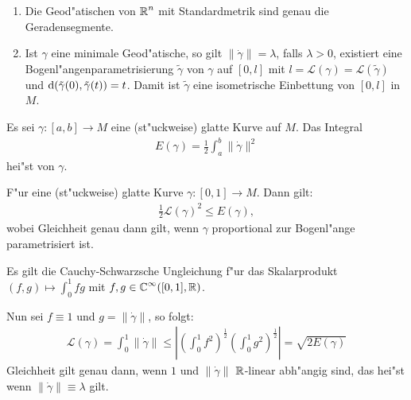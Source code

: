 
\begin{bem}
  \begin{enumerate}[label=(\arabic*),leftmargin=*]
  \item Die Geod"atischen von $\operatorname{\mathbb{R}}^n$ mit Standardmetrik sind genau die Geradensegmente.
  \item Ist $\gamma$ eine minimale Geod"atische, so gilt $\|\dot\gamma\| = \lambda$, falls $\lambda > 0$, existiert eine Bogenl"angenparametrisierung $\tilde\gamma$ von $\gamma$ auf $[0,l]$ mit $l = \mathcal L(\gamma) = \mathcal L(\tilde\gamma)$ und $\mathrm{d}(\tilde\gamma(0),\tilde\gamma(t)) = t$.
    Damit ist $\tilde\gamma$ eine isometrische Einbettung von $[0,l]$ in $M$.
  \end{enumerate}
\end{bem}

\begin{Dfn}
  Es sei $\gamma \colon [a,b] \to M$ eine (st"uckweise) glatte Kurve auf $M$.
  Das Integral
  \begin{align*}
    E(\gamma) = \frac{1}2 \int_a^b\|\dot\gamma\|^2
  \end{align*}
  hei"st  von $\gamma$.
\end{Dfn}

\begin{Lemma}\label{lemma-6-9}
  F"ur eine (st"uckweise) glatte Kurve $\gamma \colon [0,1] \to M$.
  Dann gilt:
  \begin{align*}
    \frac{1}2 \mathcal L(\gamma)^2 \leq E(\gamma),
  \end{align*}
  wobei Gleichheit genau dann gilt, wenn $\gamma$ proportional zur Bogenl"ange parametrisiert ist.
\end{Lemma}

\begin{bew}
  Es gilt die Cauchy-Schwarzsche Ungleichung f"ur das Skalarprodukt $(f,g) \mapsto \int_0^1 fg$ mit $f,g \in \operatorname{\mathbb{C}}^{\infty}([0,1], \operatorname{\mathbb{R}})$.

  Nun sei $f \equiv 1$ und $g = \|\dot\gamma\|$, so folgt:
  \begin{align*}
    \mathcal L(\gamma) = \int_0^1 \|\dot\gamma\| \leq \left|\left(\int_0^1 f^2\right)^{\frac{1}2} \left(\int_0^1g^2\right)^{\frac{1}2}\right| = \sqrt{2 E(\gamma)}
  \end{align*}
  Gleichheit gilt genau dann, wenn $1$ und $\|\dot\gamma\|$ $\operatorname{\mathbb{R}}$-linear abh"angig sind, das hei"st wenn $\|\dot\gamma\| \equiv \lambda$ gilt.
\end{bew}

